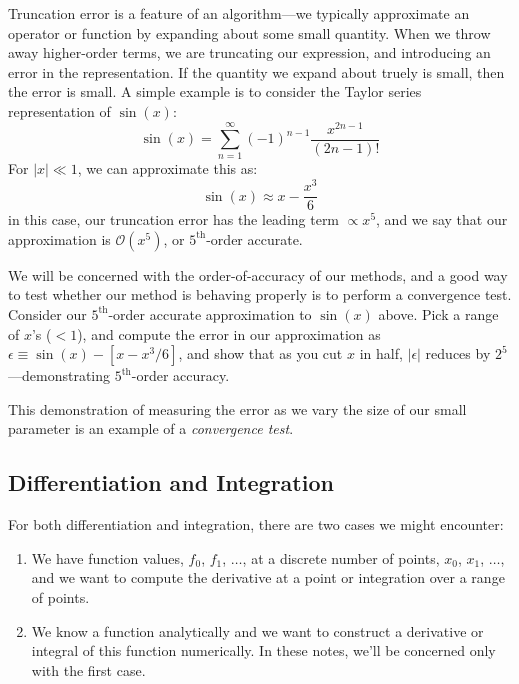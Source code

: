Truncation error is a feature of an algorithm---we typically
approximate an operator or function by expanding about some small
quantity.  When we throw away higher-order terms, we are truncating
our expression, and introducing an error in the representation.  If
the quantity we expand about truely is small, then the error is small.
A simple example is to consider the Taylor series representation of
$\sin(x)$:
\begin{equation}
\sin(x) = \sum_{n=1}^\infty (-1)^{n-1} \frac{x^{2n-1}}{(2n-1)!} 
\end{equation}
For $|x| \ll 1$, we can approximate this as:
\begin{equation}
\sin(x) \approx x - \frac{x^3}{6}
\end{equation}
in this case, our truncation error has the leading term $\propto x^5$,
and we say that our approximation is $\mathcal{O}(x^5)$, or
$5^\mathrm{th}$-order accurate.

\begin{exercise}
We will be concerned with the order-of-accuracy of our methods, and a
good way to test whether our method is behaving properly is to perform
a convergence test.  Consider our $5^\mathrm{th}$-order accurate
approximation to $\sin(x)$ above.  Pick a range of $x$'s ($< 1$), and
compute the error in our approximation as $\epsilon \equiv \sin(x) - [
  x - x^3/6 ]$, and show that as you cut $x$ in half, $|\epsilon|$
reduces by $2^5$---demonstrating $5^\mathrm{th}$-order accuracy.
\end{exercise}

This demonstration of measuring the error as we vary the size
of our small parameter is an example of a {\em convergence test}.

\subsection{Differentiation and Integration}

For both differentiation and integration, there are two cases we might
encounter:
\begin{enumerate}
\item We have function values, $f_0$, $f_1$, $\ldots$, at a discrete
  number of points, $x_0$, $x_1$, $\ldots$, and we want to compute the
  derivative at a point or integration over a range of points.
\item We know a function analytically and we want to construct a
  derivative or integral of this function numerically.  In these
  notes, we'll be concerned only with the first case.
\end{enumerate}

